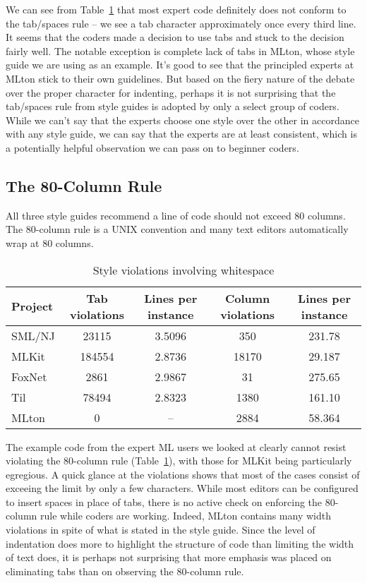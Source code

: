\documentclass[12pt,abstracton]{scrartcl}
\begin{document}
We can see from Table~\ref{table:whitespace} that most expert code definitely does
not conform to the tab/spaces rule -- we see a tab character approximately once every third line.
It seems that the coders made a decision to use tabs and stuck to the decision fairly well.
The notable exception is complete lack of tabs in MLton, whose style guide we are using as an example.
It's good to see that the principled experts at MLton stick to their own guidelines.
But based on the fiery nature of the debate over the proper character
for indenting, perhaps it is not surprising that the tab/spaces
rule from style guides is adopted by only a select group of coders.
While we can't say that the experts choose one style over the other in accordance with
any style guide, we can say that the experts are at least consistent, which is
a potentially helpful observation we can pass on to beginner coders.
\subsection{The 80-Column Rule}\label{subsec:80}
All three style guides recommend a line of code should not exceed 80 columns.
The 80-column rule is a UNIX convention and many text editors automatically
wrap at 80 columns. \cite{Cmu12}

\begin{table}[t!]
\centering
\begin{tabular}{|l||c|c||c|c|}
\hline
Project & Tab violations & Lines per instance & Column violations & Lines per instance \\ \hline\hline
SML/NJ & 23115 & 3.5096 & 350 & 231.78 \\
MLKit & 184554 & 2.8736 & 18170 & 29.187 \\
FoxNet & 2861 & 2.9867 & 31 & 275.65 \\
Til & 78494 & 2.8323 & 1380 & 161.10 \\
MLton & 0 & -- & 2884 & 58.364 \\ \hline
\end{tabular}
\caption{Style violations involving whitespace}
\label{table:whitespace}
\end{table}

The example code from the expert ML users we looked at clearly cannot
resist violating the 80-column rule (Table~\ref{table:whitespace}), with
those for MLKit being particularly egregious. A quick glance
at the violations shows that most of the cases consist of exceeing the limit
by only a few characters. While most editors can be configured to insert
spaces in place of tabs, there is no active check on enforcing the 80-column
rule while coders are working.
Indeed, MLton contains many width violations in spite of what is stated in the style guide.
Since the level of indentation does more to highlight the structure of code than
limiting the width of text does, it is perhaps not surprising that more
emphasis was placed on eliminating tabs than on observing the 80-column rule.
\end{document}
